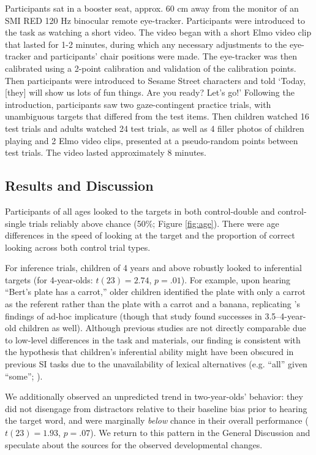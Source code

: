 \documentclass[10pt,letterpaper]{article}
\begin{document}
Participants sat in a booster seat, approx. 60 cm away from the monitor of an SMI RED 120 Hz binocular remote eye-tracker. Participants were introduced to the task as watching a short video. The video began with a short Elmo video clip that lasted for 1-2 minutes, during which any necessary adjustments to the eye-tracker and participants' chair positions were made. The eye-tracker was then calibrated using a 2-point calibration and validation of the calibration points. Then participants were introduced to Sesame Street characters and told `Today, [they] will show us lots of fun things. Are you ready? Let's go!' Following the introduction, participants saw two gaze-contingent practice trials, with unambiguous targets that differed from the test items. Then children watched 16 test trials and adults watched 24 test trials, as well as 4 filler photos of children playing and 2 Elmo video clips, presented at a pseudo-random points between test trials. The video lasted approximately 8 minutes.

\subsection{Results and Discussion}

Participants of all ages looked to the targets in both control-double and control-single trials reliably above chance (50\%; Figure \ref{fig:age}). There were age differences in the speed of looking at the target and the proportion of correct looking across both control trial types.

For inference trials, children of 4 years and above robustly looked to inferential targets (for 4-year-olds: $t(23) = 2.74$, $p =.01$). For example, upon hearing ``Bert's plate has a carrot,'' older children identified the plate with only a carrot as the referent rather than the plate with a carrot and a banana, replicating 's findings of ad-hoc implicature (though that study found successes in 3.5--4-year-old children as well). Although previous studies are not directly comparable due to low-level differences in the task and materials, our finding is consistent with the hypothesis that children's inferential ability might have been obscured in previous SI tasks due to the unavailability of lexical alternatives (e.g. ``all'' given ``some''; ).

We additionally observed an unpredicted trend in two-year-olds' behavior: they did not disengage from distractors relative to their baseline bias prior to hearing the target word, and were marginally \emph{below} chance in their overall performance ($t(23)  = 1.93$, $p = .07$). We return to this pattern in the General Discussion and speculate about the sources for the observed developmental changes.
\end{document}
